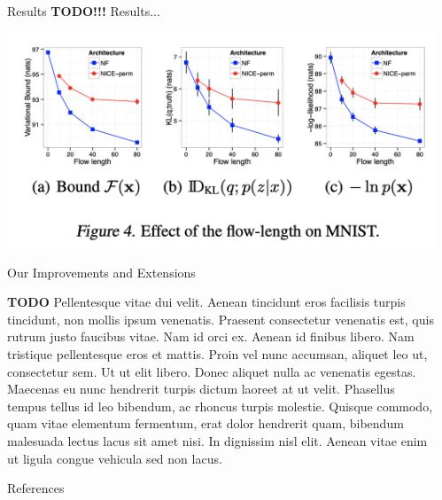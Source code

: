 \documentclass[final,hyperref={pdfpagelabels=false}]{beamer}
\newcommand{\shrink}{-15pt}
\begin{document}
\begin{frame}[t]
\begin{columns}[t]
\begin{column}{.3\textwidth}
    \vspace{\shrink} 
    \begin{block}{Results}
        \textbf{TODO!!!}         
      Results...
    \end{block}
    
       \begin{center}
        \includegraphics[width=0.9\columnwidth]{flowlen}
      \end{center}
    
    
    \begin{block}{Our Improvements and Extensions}
    
	\textbf{TODO} Pellentesque vitae dui velit. Aenean tincidunt eros facilisis turpis tincidunt, non mollis ipsum venenatis. Praesent consectetur venenatis est, quis rutrum justo faucibus vitae. Nam id orci ex. Aenean id finibus libero. Nam tristique pellentesque eros et mattis. Proin vel nunc accumsan, aliquet leo ut, consectetur sem. Ut ut elit libero. Donec aliquet nulla ac venenatis egestas. Maecenas eu nunc hendrerit turpis dictum laoreet at ut velit. Phasellus tempus tellus id leo bibendum, ac rhoncus turpis molestie. Quisque commodo, quam vitae elementum fermentum, erat dolor hendrerit quam, bibendum malesuada lectus lacus sit amet nisi. In dignissim nisl elit. Aenean vitae enim ut ligula congue vehicula sed non lacus.    
	
	\end{block}

    \begin{block}{References}
      \nocite{*} %
      \linespread{0.928}\selectfont
      \footnotesize{
      }
    \end{block}

  \end{column} %

  \begin{column}{.02\textwidth}\end{column} %

\end{columns} %

\end{frame} %
\end{document}
